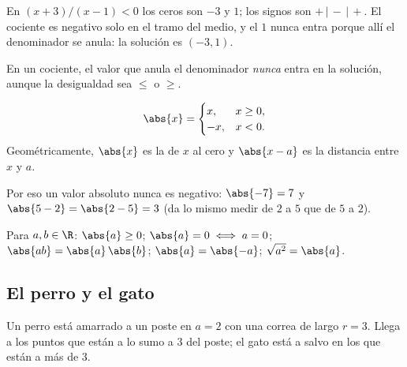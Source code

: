 \documentclass[11pt,a4paper]{article}
\begin{document}
\begin{ejemplo}
En $(x+3)/(x-1)<0$ los ceros son $-3$ y $1$; los signos son $+\,|\,-\,|\,+$. El cociente es negativo solo en el
tramo del medio, y el $1$ nunca entra porque allí el denominador se anula: la solución es $(-3,1)$.
\end{ejemplo}

\begin{ojo}
En un cociente, el valor que anula el denominador \emph{nunca} entra en la solución, aunque la desigualdad sea $\le$ o $\ge$.
\end{ojo}


\begin{definicion}
\[ \abs{x}=\begin{cases} x, & x\ge 0,\\ -x, & x<0.\end{cases} \]
Geométricamente, $\abs{x}$ es la  de $x$ al cero y $\abs{x-a}$ es la distancia entre $x$ y $a$.
\end{definicion}

Por eso un valor absoluto nunca es negativo: $\abs{-7}=7$ y $\abs{5-2}=\abs{2-5}=3$ (da lo mismo medir de $2$ a $5$
que de $5$ a $2$).

\begin{propiedad}
Para $a,b\in\R$: \quad $\abs{a}\ge 0$; \quad $\abs{a}=0\iff a=0$; \quad $\abs{ab}=\abs{a}\,\abs{b}$; \quad $\abs{a}=\abs{-a}$; \quad $\sqrt{a^2}=\abs{a}$.
\end{propiedad}

\subsection{El perro y el gato}
Un perro está amarrado a un poste en $a=2$ con una correa de largo $r=3$. Llega a los puntos que están a lo sumo a
$3$ del poste; el gato está a salvo en los que están a más de $3$.
\end{document}
